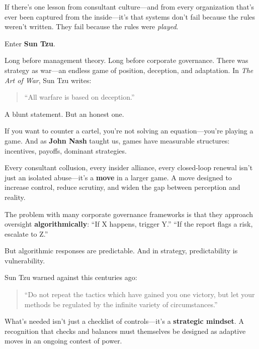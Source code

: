 If there’s one lesson from consultant culture—and from every organization that’s ever been captured from the inside—it’s that systems don’t fail because the rules weren’t written. They fail because the rules were \textit{played}.

\medskip

\noindent
Enter \textbf{Sun Tzu}.

Long before management theory. Long before corporate governance. There was strategy as war—an endless game of position, deception, and adaptation. In \textit{The Art of War}, Sun Tzu writes:

\begin{quote}
“All warfare is based on deception.”
\end{quote}

A blunt statement. But an honest one.

\medskip

If you want to counter a cartel, you’re not solving an equation—you’re playing a game. And as \textbf{John Nash} taught us, games have measurable structures: incentives, payoffs, dominant strategies. 

Every consultant collusion, every insider alliance, every closed-loop renewal isn’t just an isolated abuse—it’s a \textbf{move} in a larger game. A move designed to increase control, reduce scrutiny, and widen the gap between perception and reality.

\medskip

The problem with many corporate governance frameworks is that they approach oversight \textbf{algorithmically}:  
“If X happens, trigger Y.”  
“If the report flags a risk, escalate to Z.”  

But algorithmic responses are predictable. And in strategy, predictability is vulnerability.

\medskip

\noindent
Sun Tzu warned against this centuries ago:

\begin{quote}
“Do not repeat the tactics which have gained you one victory, but let your methods be regulated by the infinite variety of circumstances.”
\end{quote}

\medskip

What’s needed isn’t just a checklist of controls—it’s a \textbf{strategic mindset}. A recognition that checks and balances must themselves be designed as adaptive moves in an ongoing contest of power.

